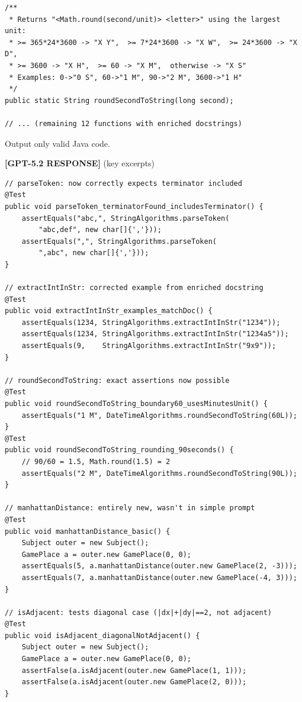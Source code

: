 \documentclass[acmsmall,nonacm]{acmart}
\begin{document}
\begin{promptbox}
\begin{verbatim}
/**
 * Returns "<Math.round(second/unit)> <letter>" using the largest unit:
 * >= 365*24*3600 -> "X Y",  >= 7*24*3600 -> "X W",  >= 24*3600 -> "X D",
 * >= 3600 -> "X H",  >= 60 -> "X M",  otherwise -> "X S"
 * Examples: 0->"0 S", 60->"1 M", 90->"2 M", 3600->"1 H"
 */
public static String roundSecondToString(long second);

// ... (remaining 12 functions with enriched docstrings)
\end{verbatim}

Output only valid Java code.
\end{promptbox}

\bigskip

\begin{responsebox}
\textbf{[GPT-5.2 RESPONSE]} (key excerpts)

\begin{verbatim}
// parseToken: now correctly expects terminator included
@Test
public void parseToken_terminatorFound_includesTerminator() {
    assertEquals("abc,", StringAlgorithms.parseToken(
        "abc,def", new char[]{','}));
    assertEquals(",", StringAlgorithms.parseToken(
        ",abc", new char[]{','}));
}

// extractIntInStr: corrected example from enriched docstring
@Test
public void extractIntInStr_examples_matchDoc() {
    assertEquals(1234, StringAlgorithms.extractIntInStr("1234"));
    assertEquals(1234, StringAlgorithms.extractIntInStr("1234a5"));
    assertEquals(9,    StringAlgorithms.extractIntInStr("9x9"));
}

// roundSecondToString: exact assertions now possible
@Test
public void roundSecondToString_boundary60_usesMinutesUnit() {
    assertEquals("1 M", DateTimeAlgorithms.roundSecondToString(60L));
}
@Test
public void roundSecondToString_rounding_90seconds() {
    // 90/60 = 1.5, Math.round(1.5) = 2
    assertEquals("2 M", DateTimeAlgorithms.roundSecondToString(90L));
}

// manhattanDistance: entirely new, wasn't in simple prompt
@Test
public void manhattanDistance_basic() {
    Subject outer = new Subject();
    GamePlace a = outer.new GamePlace(0, 0);
    assertEquals(5, a.manhattanDistance(outer.new GamePlace(2, -3)));
    assertEquals(7, a.manhattanDistance(outer.new GamePlace(-4, 3)));
}

// isAdjacent: tests diagonal case (|dx|+|dy|==2, not adjacent)
@Test
public void isAdjacent_diagonalNotAdjacent() {
    Subject outer = new Subject();
    GamePlace a = outer.new GamePlace(0, 0);
    assertFalse(a.isAdjacent(outer.new GamePlace(1, 1)));
    assertFalse(a.isAdjacent(outer.new GamePlace(2, 0)));
}
\end{verbatim}
\end{responsebox}
\end{document}
